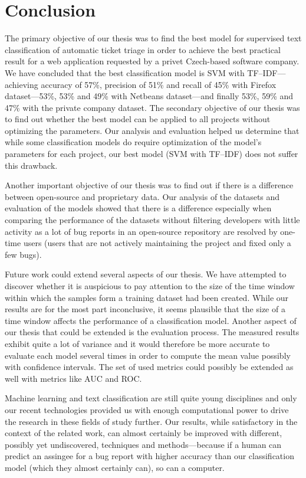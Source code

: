 \chapter{Conclusion}

The primary objective of our thesis was to find the best model for supervised text classification of automatic ticket triage in order to achieve the best practical result for a web application requested by a privet Czech-based software company. We have concluded that the best classification model is SVM with TF--IDF---achieving accuracy of 57\%, precision of 51\% and recall of 45\% with Firefox dataset---53\%, 53\% and 49\% with Netbeans dataset---and finally 53\%, 59\% and 47\% with the private company dataset. The secondary objective of our thesis was to find out whether the best model can be applied to all projects without optimizing the parameters. Our analysis and evaluation helped us determine that while some classification models do require optimization of the model's parameters for each project, our best model (SVM with TF--IDF) does not suffer this drawback.

Another important objective of our thesis was to find out if there is a difference between open-source and proprietary data. Our analysis of the datasets and evaluation of the models showed that there is a difference especially when comparing the performance of the datasets without filtering developers with little activity as a lot of bug reports in an open-source repository are resolved by one-time users (users that are not actively maintaining the project and fixed only a few bugs).

Future work could extend several aspects of our thesis. We have attempted to discover whether it is auspicious to pay attention to the size of the time window within which the samples form a training dataset had been created. While our results are for the most part inconclusive, it seems plausible that the size of a time window affects the performance of a classification model. Another aspect of our thesis that could be extended is the evaluation process. The measured results exhibit quite a lot of variance and it would therefore be more accurate to evaluate each model several times in order to compute the mean value possibly with confidence intervals. The set of used metrics could possibly be extended as well with metrics like AUC and ROC.

Machine learning and text classification are still quite young disciplines and only our recent technologies provided us with enough computational power to drive the research in these fields of study further. Our results, while satisfactory in the context of the related work, can almost certainly be improved with different, possibly yet undiscovered, techniques and methods---because if a human can predict an assingee for a bug report with higher accuracy than our classification model (which they almost certainly can), so can a computer.
